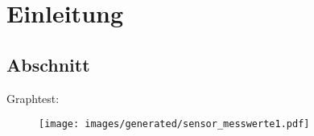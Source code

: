 \chapter{Einleitung}
\section{Abschnitt}
Graphtest:
\begin{figure}[hb] \centering
  \texttt{[image: images/generated/sensor\_messwerte1.pdf]}
 \end{figure}
